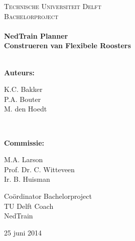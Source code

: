 
\usepackage{amsmath}
\usepackage{amssymb}
\usepackage{pdfpages}
\usepackage{rotating}
\usepackage{float}



\begin{titlepage}
\center
\textsc{Technische Universiteit Delft}\\[0.2cm]
\textsc{\Huge Bachelorproject}\\[1.5cm]
\HRule \\[0.4cm]
{\Huge \bfseries NedTrain Planner}\\[0.5cm]
{\LARGE \bfseries Construeren van Flexibele Roosters}\\[0.4cm]
\HRule \\[1.5cm]

\begin{large}
\raggedright
\textbf{Auteurs:}\\[0.1cm]
\begin{minipage}{\textwidth}
\flushleft
K.C. Bakker \\
P.A. Bouter \\
M. den Hoedt \\
\end{minipage}\\[1cm]
\raggedright
\textbf{Commissie:}\\[0.1cm]
\begin{minipage}{0.5\textwidth}
\flushleft
M.A. Larson \\
Prof. Dr. C. Witteveen \\
Ir. B. Huisman \\
\end{minipage}%
\begin{minipage}{0.5\textwidth}
\flushright
Co\"ordinator Bachelorproject\\
TU Delft Coach \\
NedTrain \\
\end{minipage}
\end{large}


\vfill
{\large 25 juni 2014}\\[2cm]


\end{titlepage}

